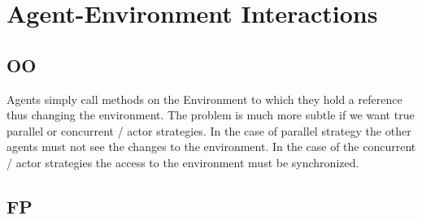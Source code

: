 \chapter{Agent-Environment Interactions}

\section{OO}
Agents simply call methods on the Environment to which they hold a reference thus changing the environment. The problem is much more subtle if we want true parallel or concurrent / actor strategies. In the case of parallel strategy the other agents must not see the changes to the environment. In the case of the concurrent / actor strategies the access to the environment must be synchronized.

\section{FP}
